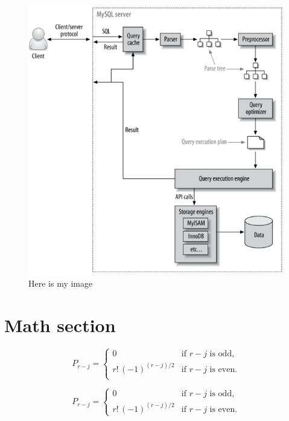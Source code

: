 \documentclass{article}
\begin{document}
\begin{figure}[hp]
  \centering
  \includegraphics[width=1\textwidth]{test}
  \caption{Here is my image}
  \label{image-myimage}
  \end{figure}


{\section{Math section}}


\begin{equation}
  P_{r-j} = 
  \left\{
      \begin{array}{cl}
      0& \text{if $r-j$ is odd},\\
      r!\,(-1)^{(r-j)/2}& \text{if $r-j$ is even}.\\
        \end{array}
  \right.
  \end{equation}

\begin{equation}
  P_{r-j}=\begin{cases}
    0& \text{if $r-j$ is odd},\\
    r!\,(-1)^{(r-j)/2}& \text{if $r-j$ is even}.
    \end{cases} 
  \end{equation}
\end{document}
